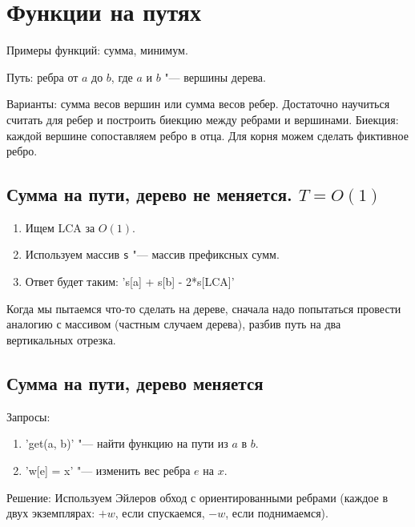 \chapter{Функции на путях}

Примеры функций: сумма, минимум.

Путь: ребра от $a$ до $b$, где $a$ и $b$ "--- вершины дерева.

Варианты: сумма весов вершин или сумма весов ребер.
Достаточно научиться считать для ребер и построить биекцию между ребрами и вершинами.
Биекция: каждой вершине сопоставляем ребро в отца.
Для корня можем сделать фиктивное ребро.

\section{Сумма на пути, дерево не меняется. \texorpdfstring{$T = O(1)$}{T = O(1)}}

\begin{enumerate}
	\item Ищем LCA за $O\left(1\right)$.
	\item Используем массив \verb's' "--- массив префиксных сумм.
	\item Ответ будет таким: \cpp's[a] + s[b] - 2*s[LCA]'
\end{enumerate}


\begin{Rem}
	Когда мы пытаемся что-то сделать на дереве, сначала надо попытаться провести аналогию с массивом (частным случаем дерева),
	разбив путь на два вертикальных отрезка.
\end{Rem}


\section{Сумма на пути, дерево меняется}

Запросы:
\begin{enumerate}
	\item \cpp'get(a, b)' "--- найти функцию на пути из $a$ в $b$.
	\item \cpp'w[e] = x' "--- изменить вес ребра $e$ на $x$.
\end{enumerate}

Решение:
Используем Эйлеров обход с ориентированными ребрами (каждое в двух экземплярах: $+w$, если спускаемся, $-w$, если поднимаемся).

